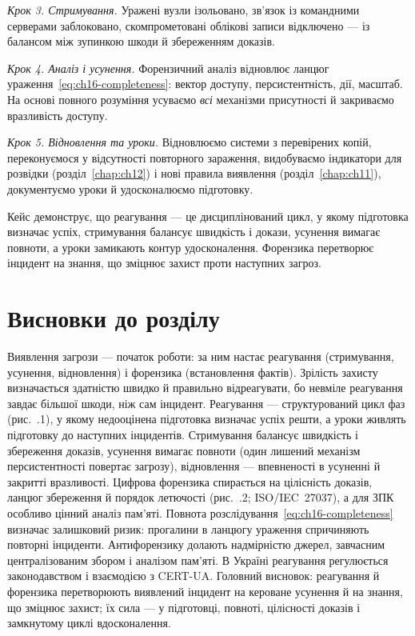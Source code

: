 \emph{Крок 3. Стримування.} Уражені вузли ізольовано, зв'язок із командними серверами заблоковано, скомпрометовані облікові записи відключено --- із балансом між зупинкою шкоди й збереженням доказів.

\emph{Крок 4. Аналіз і усунення.} Форензичний аналіз відновлює ланцюг ураження~\eqref{eq:ch16-completeness}: вектор доступу, персистентність, дії, масштаб. На основі повного розуміння усуваємо \emph{всі} механізми присутності й закриваємо вразливість доступу.

\emph{Крок 5. Відновлення та уроки.} Відновлюємо системи з перевірених копій, переконуємося у відсутності повторного зараження, видобуваємо індикатори для розвідки (розділ~\ref{chap:ch12}) і нові правила виявлення (розділ~\ref{chap:ch11}), документуємо уроки й удосконалюємо підготовку.

Кейс демонструє, що реагування --- це дисциплінований цикл, у якому підготовка визначає успіх, стримування балансує швидкість і докази, усунення вимагає повноти, а уроки замикають контур удосконалення. Форензика перетворює інцидент на знання, що зміцнює захист проти наступних загроз.

\section*{Висновки до розділу}

Виявлення загрози --- початок роботи: за ним настає реагування (стримування, усунення, відновлення) і форензика (встановлення фактів). Зрілість захисту визначається здатністю швидко й правильно відреагувати, бо невміле реагування завдає більшої шкоди, ніж сам інцидент. Реагування --- структурований цикл фаз (рис.~\thechapter.1), у якому недооцінена підготовка визначає успіх решти, а уроки живлять підготовку до наступних інцидентів. Стримування балансує швидкість і збереження доказів, усунення вимагає повноти (один лишений механізм персистентності повертає загрозу), відновлення --- впевненості в усуненні й закритті вразливості. Цифрова форензика спирається на цілісність доказів, ланцюг збереження й порядок летючості (рис.~\thechapter.2; ISO/IEC~27037), а для ЗПК особливо цінний аналіз пам'яті. Повнота розслідування~\eqref{eq:ch16-completeness} визначає залишковий ризик: прогалини в ланцюгу ураження спричиняють повторні інциденти. Антифорензику долають надмірністю джерел, завчасним централізованим збором і аналізом пам'яті. В Україні реагування регулюється законодавством і взаємодією з CERT-UA. Головний висновок: реагування й форензика перетворюють виявлений інцидент на кероване усунення й на знання, що зміцнює захист; їх сила --- у підготовці, повноті, цілісності доказів і замкнутому циклі вдосконалення.


